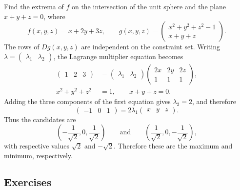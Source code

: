 	\begin{example}
	  \label{ex:2-constraints-in-r3}
		Find the extrema of $f$ on the intersection of the unit sphere and the plane $x+y+z=0$, where
		\begin{equation}
			f(x,y,z)=x+2y+3z,
			\qquad
			g(x,y,z)=\begin{pmatrix} x^2+y^2+z^2-1 \\ x+y+z \end{pmatrix}.
		\end{equation}
		The rows of $Dg(x,y,z)$ are independent on the constraint set. Writing $\lambda=\begin{pmatrix} \lambda_1 & \lambda_2 \end{pmatrix}$, the Lagrange multiplier equation becomes
		\begin{equation}
			\begin{aligned}
			\begin{pmatrix} 1 & 2 & 3 \end{pmatrix}
			&= \begin{pmatrix} \lambda_1 & \lambda_2 \end{pmatrix}
			\begin{pmatrix}
				2x & 2y & 2z \\
				1 & 1 & 1
			\end{pmatrix}, \\
			x^2+y^2+z^2&=1,
			\qquad x+y+z=0.
			\end{aligned}
		\end{equation}
		Adding the three components of the first equation gives $\lambda_2=2$, and therefore
		\begin{equation}
			\begin{pmatrix} -1 & 0 & 1 \end{pmatrix}
			=2\lambda_1\begin{pmatrix} x & y & z \end{pmatrix}.
		\end{equation}
		Thus the candidates are
		\begin{equation}
			\left(-\frac{1}{\sqrt{2}},0,\frac{1}{\sqrt{2}}\right)
			\qquad \text{and} \qquad
			\left(\frac{1}{\sqrt{2}},0,-\frac{1}{\sqrt{2}}\right),
		\end{equation}
		with respective values $\sqrt{2}$ and $-\sqrt{2}$. Therefore these are the maximum and minimum, respectively.
	\end{example}

\subsection{Exercises}

